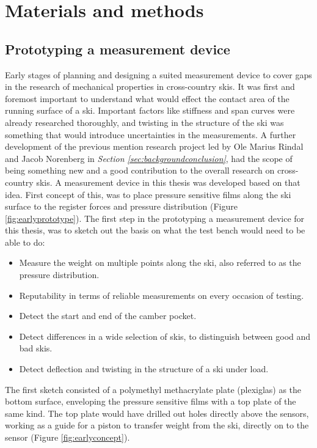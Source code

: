 \chapter{Materials and methods}
\label{chap:materialsandmethods}
\section{Prototyping a measurement device}
\label{sec:measurementdevice}
Early stages of planning and designing a suited measurement device to cover gaps in the research of mechanical properties in cross-country skis. It was first and foremost important to understand what would effect the contact area of the running surface of a ski.
Important factors like stiffness and span curves were already researched thoroughly\citep{breitschadel_variation_2012,breitschadel_technical_2014, backstrom_essential_2008}, and twisting in the structure of the ski was something that would introduce uncertainties in the measurements. 
A further development of the previous mention research project led by Ole Marius Rindal and Jacob Norenberg in \textit{Section \ref{sec:backgroundconclusion}}, had the scope of being something new and a good contribution to the overall research on cross-country skis.
A measurement device in this thesis was developed based on that idea. First concept of this, was to place pressure sensitive films along the ski surface to the register forces and pressure distribution (Figure \ref{fig:earlyprototype}).
The first step in the prototyping a measurement device for this thesis, was to sketch out the basis on what the test bench would need to be able to do:
\begin{itemize}
    \item Measure the weight on multiple points along the ski, also referred to as the pressure distribution.
    \item Reputability in terms of reliable measurements on every occasion of testing.
    \item Detect the start and end of the camber pocket.
    \item Detect differences in a wide selection of skis, to distinguish between good and bad skis.
    \item Detect deflection and twisting in the structure of a ski under load.
\end{itemize}

The first sketch consisted of a polymethyl methacrylate plate (plexiglas) as the bottom surface, enveloping the pressure sensitive films with a top plate of the same kind. The top plate would have drilled out holes directly above the sensors, working as a guide for a piston to transfer weight from the ski, directly on to the sensor (Figure \ref{fig:earlyconcept}).

